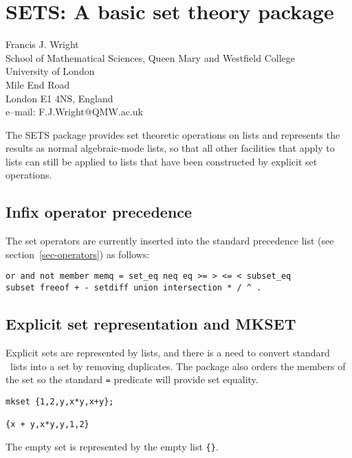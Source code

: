 \chapter{SETS: A basic set theory package}
\label{SETS}

{\footnotesize
\begin{center}
Francis J. Wright \\
School of Mathematical Sciences, Queen Mary and Westfield College \\
University of London \\
Mile End Road \\
London E1 4NS, England \\[0.05in]
e--mail: F.J.Wright@QMW.ac.uk
\end{center}
}

The SETS package provides set theoretic operations on lists and represents
the results as normal algebraic-mode lists, so that all other \REDUCE{}
facilities that apply to lists can still be applied to lists that have
been constructed by explicit set operations.

\section{Infix operator precedence}

The set operators are currently inserted into the standard \REDUCE{}
precedence list (see section~\ref{sec-operators}) as follows:
\begin{verbatim}
or and not member memq = set_eq neq eq >= > <= < subset_eq
subset freeof + - setdiff union intersection * / ^ .
\end{verbatim}

\section{Explicit set representation and MKSET}

Explicit sets are represented by lists, and there is a need to convert
standard \REDUCE\ lists into a set by removing duplicates.  The
package also orders the members of the set so the standard {\tt =}
predicate will provide set equality.
\begin{verbatim}
mkset {1,2,y,x*y,x+y};

{x + y,x*y,y,1,2}
\end{verbatim}

The empty set is represented by the empty list \verb|{}|.


